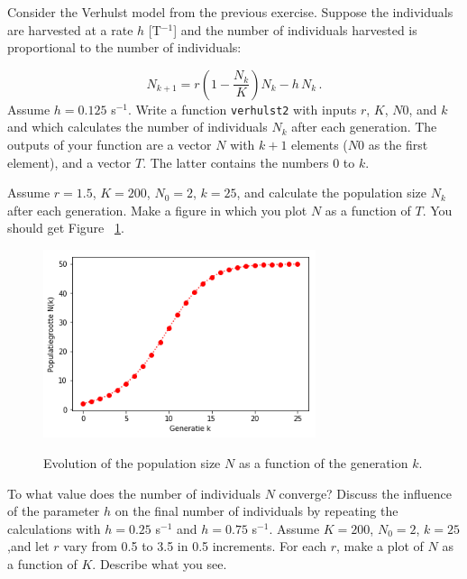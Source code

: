 \begin{Exercise}Consider the Verhulst model from the previous exercise. Suppose the individuals are harvested at a rate
 $h$ [T$^{-1}$] and the number of individuals harvested is proportional to the number of individuals:

	$$
	N_{k+1} = r\left(1 - \frac{N_k}{K}\right)N_k - h\,N_k\,.
	$$
    Assume $h = 0.125$ s$^{-1}$.
    \Question Write a function \texttt{verhulst2} with inputs $r$, $K$, $N0$, and $k$ and which calculates the number of individuals $N_k$ after each generation. The outputs of your function are a vector $N$ with $k+1$ elements ($N0$ as the first element), and a vector $T$. The latter contains the numbers $0$ to $k$.

    \Question Assume $r = 1.5$, $K = 200$, $N_0 = 2$, $k = 25$, and calculate the population size $N_k$ after each generation.
    \Question Make a figure in which you plot $N$ as a function of $T$. You should get Figure ~\ref{fig:verhulst2}.
    \begin{figure}[H]
				\centering
				\includegraphics[width=8cm]{verhulst2.png}\\
				\caption{Evolution of the population size $N$ as a function of the generation $k$.\label{fig:verhulst2}}
	\end{figure}
	To what value does the number of individuals $N$ converge?		
    \Question Discuss the influence of the parameter $h$ on the final number of individuals by repeating the calculations with $h = 0.25$ s$^{-1}$ and $h = 0.75$ s$^{-1}$.
    \Question Assume $K = 200$, $N_0 = 2$, $k = 25$,and let $r$ vary from 0.5 to 3.5 in 0.5 increments. For each $r$, make a plot of $N$ as a function of $K$. Describe what you see.
    \EndCurrentQuestion
\end{Exercise}

